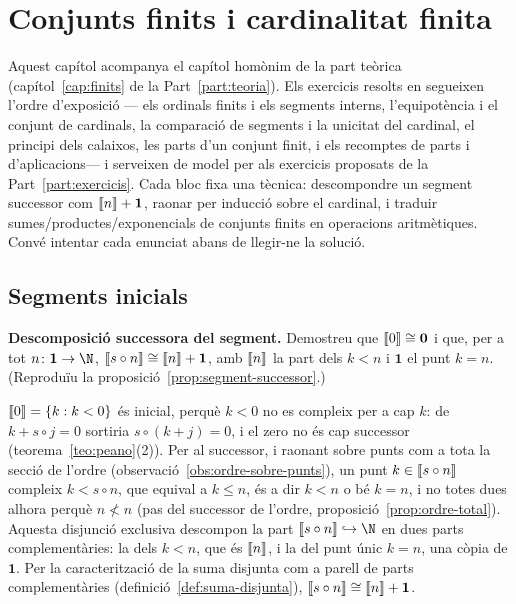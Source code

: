 \chapter{Conjunts finits i cardinalitat finita}\label{cap:practica-finits}

Aquest capítol acompanya el capítol homònim de la part teòrica (capítol~\ref{cap:finits} de la Part~\ref{part:teoria}). Els exercicis resolts en segueixen l'ordre d'exposició --- els ordinals finits i els segments interns, l'equipotència i el conjunt de cardinals, la comparació de segments i la unicitat del cardinal, el principi dels calaixos, les parts d'un conjunt finit, i els recomptes de parts i d'aplicacions--- i serveixen de model per als exercicis proposats de la Part~\ref{part:exercicis}. Cada bloc fixa una tècnica: descompondre un segment successor com \(\llbracket n\rrbracket+\mathbf1\), raonar per inducció sobre el cardinal, i traduir sumes/productes/exponencials de conjunts finits en operacions aritmètiques. Convé intentar cada enunciat abans de llegir-ne la solució.

\section{Segments inicials}\label{prac:segments}

\begin{exercici}
\textbf{Descomposició successora del segment.} Demostreu que \(\llbracket 0\rrbracket\cong\mathbf0\) i que, per a tot \(n\colon\mathbf1\to\N\), \(\llbracket s\circ n\rrbracket\cong\llbracket n\rrbracket+\mathbf1\), amb \(\llbracket n\rrbracket\) la part dels \(k<n\) i \(\mathbf1\) el punt \(k=n\). (Reproduïu la proposició~\ref{prop:segment-successor}.)
\end{exercici}
\begin{solucio}
\(\llbracket 0\rrbracket=\{k:k<0\}\) és inicial, perquè \(k<0\) no es compleix per a cap \(k\): de \(k+s\circ j=0\) sortiria \(s\circ(k+j)=0\), i el zero no és cap successor (teorema~\ref{teo:peano}(2)). Per al successor, i raonant sobre punts com a tota la secció de l'ordre (observació~\ref{obs:ordre-sobre-punts}), un punt \(k\in\llbracket s\circ n\rrbracket\) compleix \(k<s\circ n\), que equival a \(k\le n\), és a dir \(k<n\) o bé \(k=n\), i no totes dues alhora perquè \(n\not<n\) (pas del successor de l'ordre, proposició~\ref{prop:ordre-total}). Aquesta disjunció exclusiva descompon la part \(\seg{s\circ n}\hookrightarrow\N\) en dues parts complementàries: la dels \(k<n\), que és \(\llbracket n\rrbracket\), i la del punt únic \(k=n\), una còpia de \(\mathbf1\). Per la caracterització de la suma disjunta com a parell de parts complementàries (definició~\ref{def:suma-disjunta}), \(\llbracket s\circ n\rrbracket\cong\llbracket n\rrbracket+\mathbf1\).
\end{solucio}

